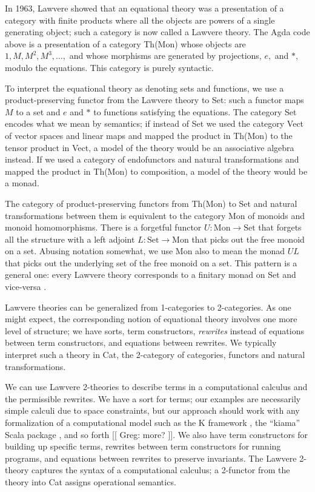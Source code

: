 \documentclass{llncs}
\newcommand{\maps}{\colon}
\newcommand{\Set}{\mathrm{Set}}
\newcommand{\Mon}{\mathrm{Mon}}
\begin{document}
  In 1963, Lawvere \cite{Lawvere} showed that an equational theory was a presentation of a category with finite products where all the objects are powers of a single generating object; such a category is now called a Lawvere theory.  The Agda code above is a presentation of a category Th(Mon) whose objects are $1, M, M^2, M^3, \ldots,$ and whose morphisms are generated by projections, $e,$ and $*,$ modulo the equations.  This category is purely syntactic.

  To interpret the equational theory as denoting sets and functions, we use a product-preserving functor from the Lawvere theory to Set: such a functor maps $M$ to a set and $e$ and $*$ to functions satisfying the equations.  The category Set encodes what we mean by semantics; if instead of Set we used the category Vect of vector spaces and linear maps and mapped the product in Th(Mon) to the tensor product in Vect, a model of the theory would be an associative algebra instead.  If we used a category of endofunctors and natural transformations and mapped the product in Th(Mon) to composition, a model of the theory would be a monad.

  The category of product-preserving functors from Th(Mon) to Set and natural transformations between them is equivalent to the category Mon of monoids and monoid homomorphisms.  There is a forgetful functor $U\maps \Mon \to \Set$ that forgets all the structure with a left adjoint $L\maps \Set \to \Mon$ that picks out the free monoid on a set.  Abusing notation somewhat, we use Mon also to mean the monad $UL$ that picks out the underlying set of the free monoid on a set.  This pattern is a general one: every Lawvere theory corresponds to a finitary monad on Set and vice-versa \cite{HylandPower}.

  Lawvere theories can be generalized from 1-categories to 2-categories.  As one might expect, the corresponding notion of equational theory involves one more level of structure; we have sorts, term constructors, {\em rewrites} instead of equations between term constructors, and equations between rewrites.  We typically interpret such a theory in Cat, the 2-category of categories, functors and natural transformations.

  We can use Lawvere 2-theories to describe terms in a computational calculus and the permissible rewrites.  We have a sort for terms; our examples are necessarily simple calculi due to space constraints, but our approach should work with any formalization of a computational model such as the K framework \cite{KFramework}, the ``kiama'' Scala package \cite{Kiama}, and so forth [[ Greg: more? ]].  We also have term constructors for building up specific terms, rewrites between term constructors for running programs, and equations between rewrites to preserve invariants.  The Lawvere 2-theory captures the syntax of a computational calculus; a 2-functor from the theory into Cat assigns operational semantics.
\end{document}
